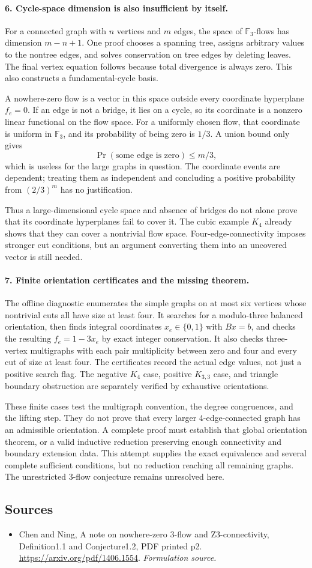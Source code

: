 \documentclass[11pt]{article}
\begin{document}
\paragraph{6. Cycle-space dimension is also insufficient by itself.}
For a connected graph with $n$ vertices and $m$ edges, the space of $\mathbb F_3$-flows has dimension $m-n+1$. One proof chooses a spanning tree, assigns arbitrary values to the nontree edges, and solves conservation on tree edges by deleting leaves. The final vertex equation follows because total divergence is always zero. This also constructs a fundamental-cycle basis.

A nowhere-zero flow is a vector in this space outside every coordinate hyperplane $f_e=0$. If an edge is not a bridge, it lies on a cycle, so its coordinate is a nonzero linear functional on the flow space. For a uniformly chosen flow, that coordinate is uniform in $\mathbb F_3$, and its probability of being zero is $1/3$. A union bound only gives
\[
 \Pr(\text{some edge is zero})\le m/3,
\]
which is useless for the large graphs in question. The coordinate events are dependent; treating them as independent and concluding a positive probability from $(2/3)^m$ has no justification.

Thus a large-dimensional cycle space and absence of bridges do not alone prove that its coordinate hyperplanes fail to cover it. The cubic example $K_4$ already shows that they can cover a nontrivial flow space. Four-edge-connectivity imposes stronger cut conditions, but an argument converting them into an uncovered vector is still needed.

\paragraph{7. Finite orientation certificates and the missing theorem.}
The offline diagnostic enumerates the simple graphs on at most six vertices whose nontrivial cuts all have size at least four. It searches for a modulo-three balanced orientation, then finds integral coordinates $x_e\in\{0,1\}$ with $Bx=b$, and checks the resulting $f_e=1-3x_e$ by exact integer conservation. It also checks three-vertex multigraphs with each pair multiplicity between zero and four and every cut of size at least four. The certificates record the actual edge values, not just a positive search flag. The negative $K_4$ case, positive $K_{3,3}$ case, and triangle boundary obstruction are separately verified by exhaustive orientations.

These finite cases test the multigraph convention, the degree congruences, and the lifting step. They do not prove that every larger 4-edge-connected graph has an admissible orientation. A complete proof must establish that global orientation theorem, or a valid inductive reduction preserving enough connectivity and boundary extension data. This attempt supplies the exact equivalence and several complete sufficient conditions, but no reduction reaching all remaining graphs. The unrestricted 3-flow conjecture remains unresolved here.

\subsection{Sources}
\begin{itemize}
\item[S1]Chen and Ning, A note on nowhere-zero 3-flow and Z3-connectivity, Definition1.1 and Conjecture1.2, PDF printed p2.
\url{https://arxiv.org/pdf/1406.1554}.
\textit{Formulation source.}
\end{itemize}
\end{document}
